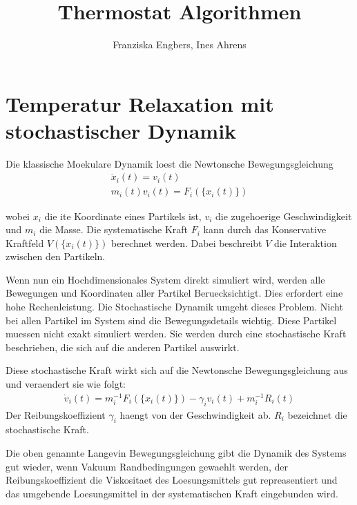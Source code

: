 \documentclass[]{article}
\title{Thermostat Algorithmen}
\author{Franziska Engbers, Ines Ahrens}
\begin{document}
\maketitle
\tableofcontents
\newpage


\section{Temperatur Relaxation mit stochastischer Dynamik}

Die klassische Moekulare Dynamik loest die Newtonsche Bewegungsgleichung
\begin{align*}
	\dot{x}_i(t) = v_i(t) \\
	m_i(t) v_i(t) = F_i(\{ x_i(t)\}) 
\end{align*}

wobei $x_i$ die ite Koordinate eines Partikels ist, $v_i$ die zugehoerige Geschwindigkeit und $m_i$ die Masse. Die systematische Kraft $F_i$ kann durch das Konservative Kraftfeld $V(\{x_i(t)\})$ berechnet werden. Dabei beschreibt $V$ die Interaktion zwischen den Partikeln.   

Wenn nun ein Hochdimensionales System direkt simuliert wird, werden alle Bewegungen und Koordinaten aller Partikel Beruecksichtigt. Dies erfordert eine hohe Rechenleistung. 
Die Stochastische Dynamik umgeht dieses Problem. Nicht bei allen Partikel im System sind die Bewegungsdetails wichtig. Diese Partikel muessen nicht exakt simuliert werden. Sie werden durch eine stochastische Kraft beschrieben, die sich auf die anderen Partikel auswirkt. 

Diese stochastische Kraft wirkt sich auf die Newtonsche Bewegungsgleichung aus und veraendert sie wie folgt:
\begin{align*}
	\dot{v}_i(t)  = m_i^{-1} F_i(\{x_i(t)\}) - \gamma_i v_i(t) + m_i^{-1} R_i(t)
\end{align*}
Der Reibungskoeffizient $\gamma_i$ haengt von der Geschwindigkeit ab. $R_i$ bezeichnet die stochastische Kraft.

Die oben genannte Langevin Bewegungsgleichung gibt die Dynamik des Systems gut wieder, wenn Vakuum Randbedingungen gewaehlt werden, der Reibungskoeffizient die Viskositaet des Loesungsmittels gut repreasentiert und das umgebende Loesungsmittel in der systematischen Kraft eingebunden wird. 
\end{document}
